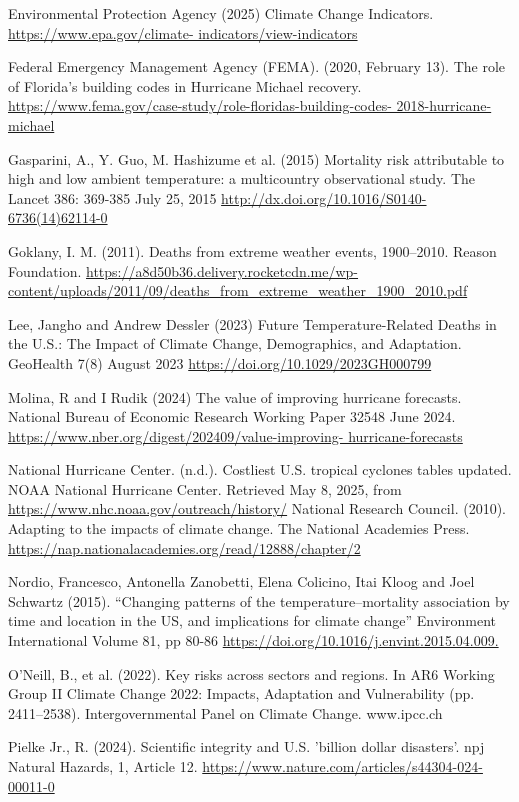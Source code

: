 \documentclass[12pt,paper=a4,DIV=12,parskip=never,chapterprefix=false,headings=standardclasses]{scrreprt}
\begin{document}
Environmental Protection Agency (2025) Climate Change Indicators. \url{https://www.epa.gov/climate-
indicators/view-indicators}

Federal Emergency Management Agency (FEMA). (2020, February 13). The role of Florida’s building
codes in Hurricane Michael recovery. \url{https://www.fema.gov/case-study/role-floridas-building-codes-
2018-hurricane-michael}

Gasparini, A., Y. Guo, M. Hashizume et al. (2015) Mortality risk attributable to high and low ambient
temperature: a multicountry observational study. The Lancet 386: 369-385 July 25, 2015
\url{http://dx.doi.org/10.1016/S0140-6736(14)62114-0}

Goklany, I. M. (2011). Deaths from extreme weather events, 1900–2010. Reason Foundation.
\url{https://a8d50b36.delivery.rocketcdn.me/wp-
content/uploads/2011/09/deaths_from_extreme_weather_1900_2010.pdf}

Lee, Jangho and Andrew Dessler (2023) Future Temperature-Related Deaths in the U.S.: The Impact of
Climate Change, Demographics, and Adaptation. GeoHealth 7(8) August 2023
\url{https://doi.org/10.1029/2023GH000799}

Molina, R and I Rudik (2024) The value of improving hurricane forecasts. National Bureau of Economic
Research Working Paper 32548 June 2024. \url{https://www.nber.org/digest/202409/value-improving-
hurricane-forecasts}

National Hurricane Center. (n.d.). Costliest U.S. tropical cyclones tables updated. NOAA National
Hurricane Center. Retrieved May 8, 2025, from \url{https://www.nhc.noaa.gov/outreach/history/}
National Research Council. (2010). Adapting to the impacts of climate change. The National Academies
Press. \url{https://nap.nationalacademies.org/read/12888/chapter/2}

Nordio, Francesco, Antonella Zanobetti, Elena Colicino, Itai Kloog and Joel Schwartz (2015). “Changing
patterns of the temperature–mortality association by time and location in the US, and implications for
climate change” Environment International Volume 81, pp 80-86
\url{https://doi.org/10.1016/j.envint.2015.04.009.}

O'Neill, B., et al. (2022). Key risks across sectors and regions. In AR6 Working Group II Climate Change
2022: Impacts, Adaptation and Vulnerability (pp. 2411–2538). Intergovernmental Panel on Climate
Change. www.ipcc.ch

Pielke Jr., R. (2024). Scientific integrity and U.S. 'billion dollar disasters'. npj Natural Hazards, 1, Article
12. \url{https://www.nature.com/articles/s44304-024-00011-0}
\end{document}
